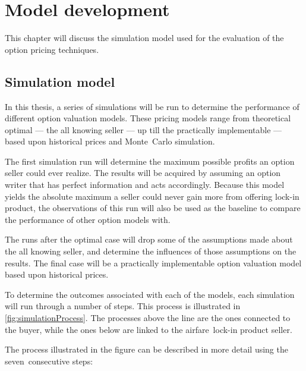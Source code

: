\chapter{Model development}
\label{chap:ModelDevelopment}
This chapter will discuss the simulation model used for the evaluation of the option pricing techniques.  

\section{Simulation model}
\label{sec:SimulationModel}
In this thesis, a series of simulations will be run to determine the performance of different option valuation models. These pricing models range from theoretical optimal --- the all knowing seller --- up till the practically implementable --- based upon historical prices and Monte~Carlo simulation.

The first simulation run will determine the maximum possible profits an option seller could ever realize. The results will be acquired by assuming an option writer that has perfect information and acts accordingly. Because this model yields the absolute maximum a seller could never gain more from offering lock-in product, the observations of this run will also be used as the baseline to compare the performance of other option models with.

The runs after the optimal case will drop some of the assumptions made about the all knowing seller, and determine the influences of those assumptions on the results. The final case will be a practically implementable option valuation model based upon historical prices.

To determine the outcomes associated with each of the models, each simulation will run through a number of steps. This process is illustrated in \autoref{fig:simulationProcess}. The processes above the line are the ones connected to the buyer, while the ones below are linked to the airfare~lock-in product seller.


The process illustrated in the figure can be described in more detail using the seven~consecutive steps:

